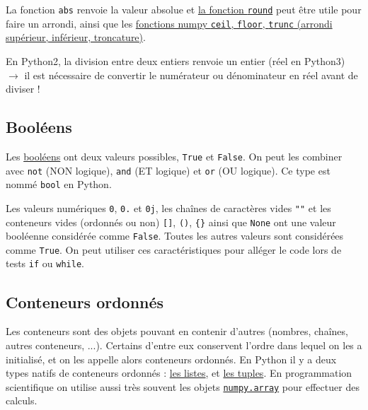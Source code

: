 \documentclass{article}
\begin{document}
La fonction \texttt{abs} renvoie la valeur absolue et \href{https://docs.python.org/fr/3.5/library/functions.html#round}{la fonction \texttt{round}} peut être utile pour faire un arrondi, ainsi que les \href{https://docs.scipy.org/doc/numpy/reference/routines.math.html#rounding}{fonctions numpy \texttt{ceil}, \texttt{floor}, \texttt{trunc} (arrondi supérieur, inférieur, troncature)}.

En Python2, la division entre deux entiers renvoie un entier (réel en Python3) $\to$ il est nécessaire de convertir le numérateur ou dénominateur en réel avant de diviser !

\subsection*{Booléens}
Les \href{https://fr.wikibooks.org/wiki/Programmation_Python/Bool\%C3\%A9ens}{booléens} ont deux valeurs possibles, \texttt{True} et \texttt{False}. On peut les combiner avec \texttt{not} (NON logique), \texttt{and} (ET logique) et \texttt{or} (OU logique). Ce type est nommé \texttt{bool} en Python.

Les valeurs numériques \texttt{0}, \texttt{0.} et \texttt{0j}, les chaînes de caractères vides \texttt{""} et les conteneurs vides (ordonnés ou non) \texttt{[]}, \texttt{()}, \texttt{\{\}} ainsi que \texttt{None} ont une valeur booléenne considérée comme \texttt{False}. Toutes les autres valeurs sont considérées comme \texttt{True}. On peut utiliser ces caractéristiques pour alléger le code lors de tests \texttt{if} ou \texttt{while}.

\subsection*{Conteneurs ordonnés}
Les conteneurs sont des objets pouvant en contenir d'autres (nombres, chaînes, autres conteneurs, ...). Certains d'entre eux conservent l'ordre dans lequel on les a initialisé, et on les appelle alors conteneurs ordonnés. En Python il y a deux types natifs de conteneurs ordonnés : \href{https://fr.wikibooks.org/wiki/Programmation_Python/Listes}{les listes},  et \href{https://fr.wikibooks.org/wiki/Programmation_Python/Tuples}{les tuples}. En programmation scientifique on utilise aussi très souvent les objets \href{https://docs.scipy.org/doc/numpy/reference/arrays.html}{\texttt{numpy.array}} pour effectuer des calculs.
\end{document}
